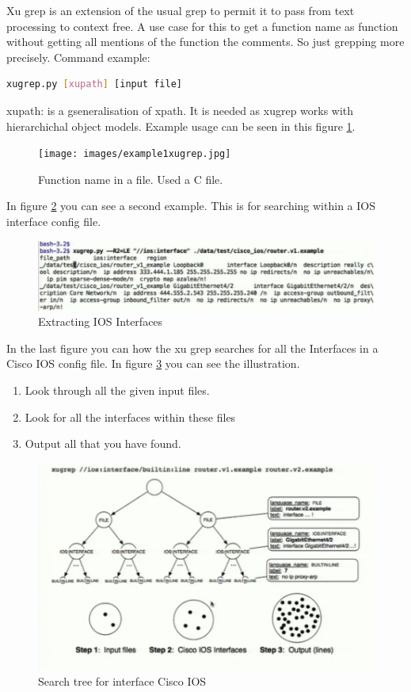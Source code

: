 Xu grep is an extension of the usual grep to permit it to pass from text processing to context free. A use case for this to get a function name as function without getting all mentions of the function the comments. So just grepping more precisely.
Command example:
\begin{lstlisting}[language=bash]
   xugrep.py [xupath] [input file]
\end{lstlisting}

xupath: is a gseneralisation of xpath. It is needed as xugrep works with hierarchichal object models.
Example usage can be seen in this figure \ref{fig:example1xugrep}.

\begin{figure}
\label{fig:example1xugrep}
\caption{Function name in a file. Used a C file.}
\texttt{[image: images/example1xugrep.jpg]}
\end{figure}

In figure \ref{fig:example2xugrep} you can see a second example. This is for searching within a IOS interface config file.

\begin{figure}
\label{fig:example2xugrep}
\caption{Extracting IOS Interfaces}
\includegraphics[width=\textwidth]{images/example2xugrep.png}
\end{figure}

In the last figure you can how the xu grep searches for all the Interfaces in a Cisco IOS config file. In figure \ref{fig:example3xugrep} you can see the illustration.
\begin{enumerate}
\item Look through all the given input files.
\item Look for all the interfaces within these files
\item Output all that you have found. 
\end{enumerate}

\begin{figure}
\label{fig:example3xugrep}
\caption{Search tree for interface Cisco IOS}
\includegraphics[width=\textwidth]{images/example3xugrep.png}
\end{figure}